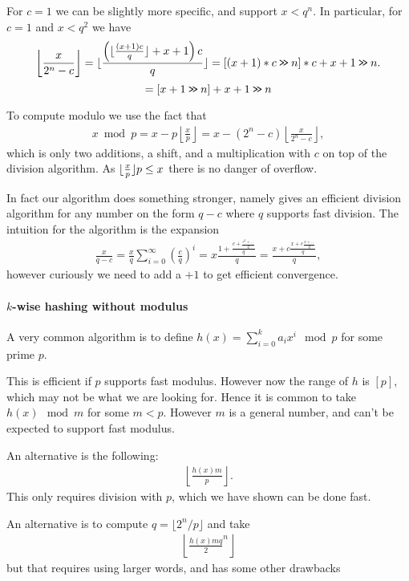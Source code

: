    For $c=1$ we can be slightly more specific, and support $x < q^n$.
   In particular, for $c=1$ and $x < q^2$ we have
   $$
   \left\lfloor\frac{x}{2^n-c}\right\rfloor
   = \lfloor {\frac{\left(\lfloor\frac{(x+1)c}{q}\rfloor+x+1\right)c}{q}} \rfloor
   = [(x+1)*c \mathbin{\texttt{>\!>}} n]*c+x+1 \mathbin{\texttt{>\!>}} n
   .
   $$
   $$
   = [x+1 \mathbin{\texttt{>\!>}} n]+x+1 \mathbin{\texttt{>\!>}} n
   $$





To compute modulo we use the fact that
\begin{align}
   x \bmod p
   = x - p\left\lfloor\frac{x}{p}\right\rfloor
   = x - (2^n - c)\left\lfloor\frac{x}{2^n-c}\right\rfloor,
\end{align}
which is only two additions, a shift, and a multiplication with $c$ on top of the division algorithm.
As $\lfloor {\frac{x}{p}} \rfloor p \le x$ there is no danger of overflow.

In fact our algorithm does something stronger, namely gives an efficient division algorithm for any number on the form $q-c$ where $q$ supports fast division.
The intuition for the algorithm is the expansion
\begin{align}
   \frac{x}{q-c}
   = \frac{x}{q}\sum_{i=0}^\infty \left(\frac{c}{q}\right)^i
   = x\frac{1+\frac{c+\frac{c^2 + \dots}{q}}{q}}{q}
   = \frac{x+c\frac{x+c\frac{x + \dots}{q}}{q}}{q},
\end{align}
however curiously we need to add a $+1$ to get efficient convergence.



\paragraph{$k$-wise hashing without modulus}

A very common algorithm is to define
$h(x) = \sum_{i=0}^k a_i x^i \mod p$
for some prime $p$.

This is efficient if $p$ supports fast modulus.
However now the range of $h$ is $[p]$, which may not be what we are looking for.
Hence it is common to take $h(x)\mod m$ for some $m<p$.
However $m$ is a general number, and can't be expected to support fast modulus.

An alternative is the following:
\begin{align}
   \left\lfloor\frac{h(x)m}{p}\right\rfloor.
\end{align}
This only requires division with $p$, which we have shown can be done fast.

An alternative is to compute $q = \lfloor2^n/p\rfloor$ and take
\begin{align}
\left\lfloor
   \frac{h(x)mq}2^n
\right\rfloor
\end{align}
but that requires using larger words, and has some other drawbacks
